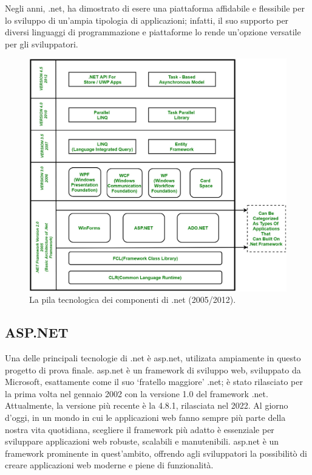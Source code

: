 Negli anni, \gls{.net}, ha dimostrato di esere una piattaforma affidabile e flessibile per lo sviluppo di un'ampia tipologia di applicazioni; infatti, il suo supporto per diversi linguaggi di programmazione e piattaforme lo rende un'opzione versatile per gli sviluppatori.

\begin{figure}[H]
\centering
\includegraphics[width=1\textwidth]{Images/net-framework-stack.jpeg}
\caption{\label{fig:netstack}La pila tecnologica dei componenti di \gls{.net} (2005/2012).}
\end{figure}


\subsection{ASP.NET}\label{sec:asp.net}
Una delle principali tecnologie di \gls{.net} è \acrfull{asp.net}, utilizata ampiamente in questo progetto di prova finale. 
\acrshort{asp.net} è un \gls{framework} di sviluppo web, sviluppato da Microsoft, esattamente come il suo `fratello maggiore' \gls{.net}; è stato rilasciato per la prima volta nel gennaio 2002 con la versione 1.0 del \gls{framework} \gls{.net}. Attualmente, la versione più recente è la 4.8.1, rilasciata nel 2022.
Al giorno d'oggi, in un mondo in cui le applicazioni web fanno sempre più parte della nostra vita quotidiana, scegliere il \gls{framework} più adatto è essenziale per sviluppare applicazioni web robuste, scalabili e manutenibili.
\acrshort{asp.net} è un \gls{framework} prominente in quest'ambito, offrendo agli sviluppatori la possibilitò di creare applicazioni web moderne e piene di funzionalità.\newline

